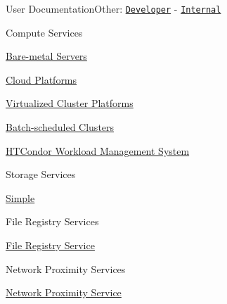 User DocumentationOther\+: \href{../developer/guide.html}{\tt Developer} -\/ \href{../internal/guide.html}{\tt Internal}


\begin{DoxyEnumerate}
\item Compute Services
\begin{DoxyEnumerate}
\item \hyperlink{guide-baremetal}{Bare-\/metal Servers}
\item \hyperlink{guide-cloud}{Cloud Platforms}
\item \hyperlink{guide-virtualizedcluster}{Virtualized Cluster Platforms}
\item \hyperlink{guide-batch}{Batch-\/scheduled Clusters}
\item \hyperlink{guide-htcondor}{H\+T\+Condor Workload Management System}
\end{DoxyEnumerate}
\item Storage Services
\begin{DoxyEnumerate}
\item \hyperlink{guide-simplestorage}{Simple}
\end{DoxyEnumerate}
\item File Registry Services
\begin{DoxyEnumerate}
\item \hyperlink{guide-fileregistry}{File Registry Service}
\end{DoxyEnumerate}
\item Network Proximity Services
\begin{DoxyEnumerate}
\item \hyperlink{guide-networkproximity}{Network Proximity Service} 
\end{DoxyEnumerate}
\end{DoxyEnumerate}